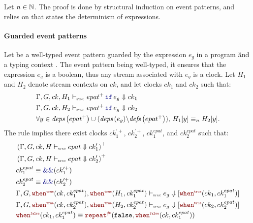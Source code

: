 \begin{skippableproof}
    Let $n \in \mathbb{N}$. The proof is done by structural induction on \GRSync event patterns, and
    relies on  that states the determinism of \GRSync
    expressions.

    \paragraph{Guarded event patterns}

    Let  be a well-typed event pattern guarded by the expression $e_g$ in a
    program \G and a typing context \tyCtx. The event pattern being well-typed, it ensures that
    the expression $e_g$ is a boolean, thus any stream associated with $e_g$ is a clock.
    Let $H_1$ and $H_2$ denote stream contexts on $ck$, and let clocks $ck_1$ and $ck_2$ such that:
    \begin{align*}
         & \epatDenot{H_1}{ck}{\guarded{epat^+}{e_g}}{ck_1}                                                   \\
         & \epatDenot{H_2}{ck}{\guarded{epat^+}{e_g}}{ck_2}                                                   \\
         & \forall y \in \deps{epat^+} \cup (\deps{e_g} \backslash \defs{epat^+}), \, H_1[y] \equiv_n H_2[y].
    \end{align*}
    The rule  implies there exist clocks $ck^{\prime+}_1$,
    $ck^{\prime+}_2$, $ck^{epat}_1$, and $ck^{epat}_2$ such that:
    \begin{align*}
         & \left(\patDenot{H}{ck}{epat}{ck'_1}\right)^+                                                  \\
         & \left(\patDenot{H}{ck}{epat}{ck'_2}\right)^+                                                  \\
         & ck^{epat}_1 \equiv \kwf{\&\&}(ck^{\prime+}_1)                                                 \\
         & ck^{epat}_2 \equiv \kwf{\&\&}(ck^{\prime+}_2)                                                 \\
         & \exprDenot{\whenT{H_1}{ck^{epat}_1}}{\whenT{ck}{ck^{epat}_1}}{e_g}{\whenT{ck_1}{ck^{epat}_1}} \\
         & \exprDenot{\whenT{H_2}{ck^{epat}_2}}{\whenT{ck}{ck^{epat}_2}}{e_g}{\whenT{ck_2}{ck^{epat}_2}} \\
         & \whenF{ck_1}{ck^{epat}_1} \equiv \const{\false}{\whenF{ck}{ck^{epat}_1}}                      \\

\end{align*}
\end{skippableproof}
